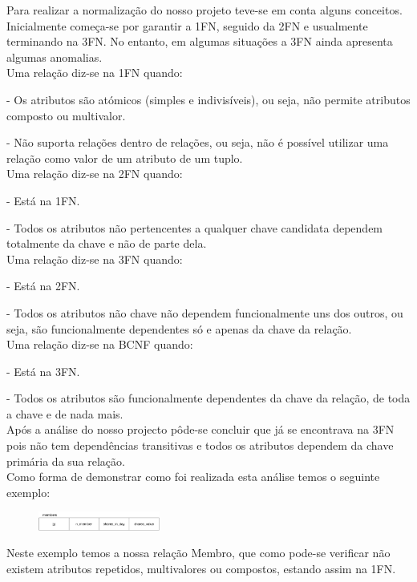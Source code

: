 \documentclass[pdftex,12pt,a4paper]{report}
\begin{document}
Para realizar a normalização do nosso projeto teve-se em conta alguns conceitos. Inicialmente começa-se por garantir a 1FN, seguido da 2FN e usualmente terminando na 3FN. No entanto, em algumas situações a 3FN ainda apresenta algumas anomalias.
\\

Uma relação diz-se na 1FN quando:

- Os atributos são atómicos (simples e  indivisíveis), ou seja, não permite atributos composto ou multivalor.

- Não suporta relações dentro de relações, ou seja, não é possível utilizar uma relação como valor de um atributo de um tuplo.
\\

Uma relação diz-se na 2FN quando:

- Está na 1FN.

- Todos os atributos não pertencentes a qualquer chave candidata dependem totalmente da chave e não de parte dela.
\\

Uma relação diz-se na 3FN quando:

- Está na 2FN.

- Todos os atributos não chave não dependem funcionalmente uns dos outros, ou seja, são funcionalmente dependentes só e apenas da chave da relação.
\\

Uma relação diz-se na BCNF quando:

- Está na 3FN.

- Todos os atributos são funcionalmente dependentes da chave da relação, de toda a chave e de nada mais.
\\

Após a análise do nosso projecto pôde-se concluir que já se encontrava na 3FN pois não tem dependências transitivas e todos os atributos dependem da chave primária da sua relação.
\\

Como forma de demonstrar como foi realizada esta análise temos o seguinte exemplo:

\begin{figure}[!htb]
 \includegraphics[width=40mm,scale=0.5]{exemplo_normalizacao.pdf}
\end{figure}

Neste exemplo temos a nossa relação Membro, que como pode-se verificar não existem atributos repetidos, multivalores ou compostos, estando assim na 1FN.
\end{document}
